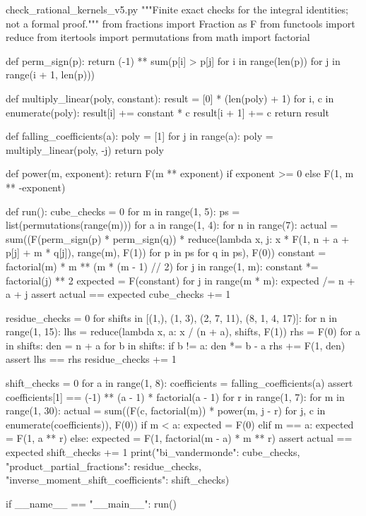 \begin{filecontents*}[overwrite]{check_rational_kernels_v5.py}
"""Finite exact checks for the integral identities; not a formal proof."""
from fractions import Fraction as F
from functools import reduce
from itertools import permutations
from math import factorial


def perm_sign(p):
    return (-1) ** sum(p[i] > p[j] for i in range(len(p))
                       for j in range(i + 1, len(p)))


def multiply_linear(poly, constant):
    result = [0] * (len(poly) + 1)
    for i, c in enumerate(poly):
        result[i] += constant * c
        result[i + 1] += c
    return result


def falling_coefficients(a):
    poly = [1]
    for j in range(a):
        poly = multiply_linear(poly, -j)
    return poly


def power(m, exponent):
    return F(m ** exponent) if exponent >= 0 else F(1, m ** -exponent)


def run():
    cube_checks = 0
    for m in range(1, 5):
        ps = list(permutations(range(m)))
        for a in range(1, 4):
            for n in range(7):
                actual = sum((F(perm_sign(p) * perm_sign(q)) *
                              reduce(lambda x, j: x * F(1, n + a + p[j] + m * q[j]),
                                     range(m), F(1))
                              for p in ps for q in ps), F(0))
                constant = factorial(m) * m ** (m * (m - 1) // 2)
                for j in range(1, m):
                    constant *= factorial(j) ** 2
                expected = F(constant)
                for j in range(m * m):
                    expected /= n + a + j
                assert actual == expected
                cube_checks += 1

    residue_checks = 0
    for shifts in [(1,), (1, 3), (2, 7, 11), (8, 1, 4, 17)]:
        for n in range(1, 15):
            lhs = reduce(lambda x, a: x / (n + a), shifts, F(1))
            rhs = F(0)
            for a in shifts:
                den = n + a
                for b in shifts:
                    if b != a:
                        den *= b - a
                rhs += F(1, den)
            assert lhs == rhs
            residue_checks += 1

    shift_checks = 0
    for a in range(1, 8):
        coefficients = falling_coefficients(a)
        assert coefficients[1] == (-1) ** (a - 1) * factorial(a - 1)
        for r in range(1, 7):
            for m in range(1, 30):
                actual = sum((F(c, factorial(m)) * power(m, j - r)
                              for j, c in enumerate(coefficients)), F(0))
                if m < a:
                    expected = F(0)
                elif m == a:
                    expected = F(1, a ** r)
                else:
                    expected = F(1, factorial(m - a) * m ** r)
                assert actual == expected
                shift_checks += 1
    print({"bi_vandermonde": cube_checks,
           "product_partial_fractions": residue_checks,
           "inverse_moment_shift_coefficients": shift_checks})


if __name__ == "__main__":
    run()

\end{filecontents*}
